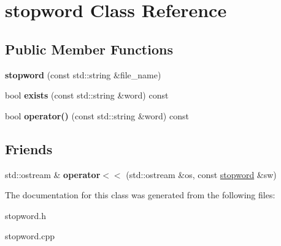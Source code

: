 \hypertarget{classstopword}{}\section{stopword Class Reference}
\label{classstopword}
\subsection*{Public Member Functions}
\begin{DoxyCompactItemize}
\item 
\mbox{\label{classstopword_accb49b6c9d5ddc75002348a869df5619}} 
{\bfseries stopword} (const std\+::string \&file\+\_\+name)
\item 
\mbox{\label{classstopword_a11210085752c2b3d63055490c13b6666}} 
bool {\bfseries exists} (const std\+::string \&word) const
\item 
\mbox{\label{classstopword_a0bee2c17bb62af157dae20b9242805aa}} 
bool {\bfseries operator()} (const std\+::string \&word) const
\end{DoxyCompactItemize}
\subsection*{Friends}
\begin{DoxyCompactItemize}
\item 
\mbox{\label{classstopword_a80e1d6c776f6a931100b5ea063e3a6ea}} 
std\+::ostream \& {\bfseries operator$<$$<$} (std\+::ostream \&os, const \hyperlink{classstopword}{stopword} \&sw)
\end{DoxyCompactItemize}


The documentation for this class was generated from the following files\+:\begin{DoxyCompactItemize}
\item 
stopword.\+h\item 
stopword.\+cpp\end{DoxyCompactItemize}
